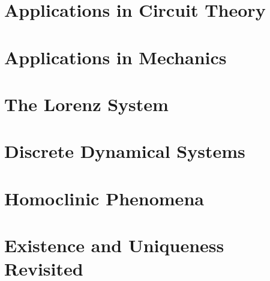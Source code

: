 \documentclass[12pt]{book}
\begin{document}
\chapter{Applications in Circuit Theory }
\chapter{Applications in Mechanics }
\chapter{The Lorenz System }
\chapter{Discrete Dynamical Systems }
\chapter{Homoclinic Phenomena }
\chapter{Existence and Uniqueness Revisited }
\end{document}
